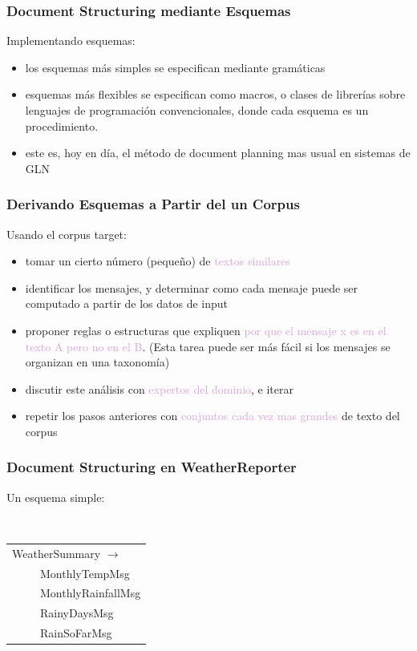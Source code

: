 \documentclass[compress,color=usenames]{beamer}
\newcommand{\mH}[1]{\textcolor{Plum}{#1}}
\begin{document}
\begin{frame}
\frametitle{Document Structuring mediante Esquemas}

{{Implementando esquemas:}}
\begin{itemize}
\item los esquemas m\'as simples se especifican mediante gram\'aticas
\item esquemas m\'as flexibles se especifican como macros, o clases de librer\'ias sobre lenguajes de 
programaci\'on convencionales, donde cada esquema es un procedimiento. 
\item este es, hoy en d\'ia, el m\'etodo de document planning mas usual en sistemas de GLN
\end{itemize}

 
\end{frame}

\begin{frame}
\frametitle{Derivando Esquemas a Partir del un Corpus}

{ {Usando el corpus target:}}
\begin{itemize}
\item tomar un cierto n\'umero (peque\~no) de \mH{textos similares}
\item identificar los mensajes, y determinar como cada mensaje puede ser computado a partir de los datos de input
\item proponer reglas o estructuras que expliquen \mH{por que el mensaje x es en el texto A pero no en el B}. (Esta tarea puede ser m\'as f\'acil si los mensajes se organizan en una taxonom\'ia) 
\item discutir este an\'alisis con \mH{expertos del dominio}, e iterar
\item repetir los pasos anteriores con \mH{conjuntos cada vez mas grandes} de texto del corpus
\end{itemize}

\end{frame}

\begin{frame}
\frametitle{Document Structuring en WeatherReporter}

 { {Un esquema simple:}}

\begin{center} \tt
\begin{tabular}{l}
WeatherSummary $\to$\\
\ \ \ \ \  MonthlyTempMsg\\
\ \ \ \ \   MonthlyRainfallMsg\\
\ \ \ \ \   RainyDaysMsg\\
\ \ \ \ \   RainSoFarMsg\\
\end{tabular}
\end{center}

 \end{frame}
\end{document}
